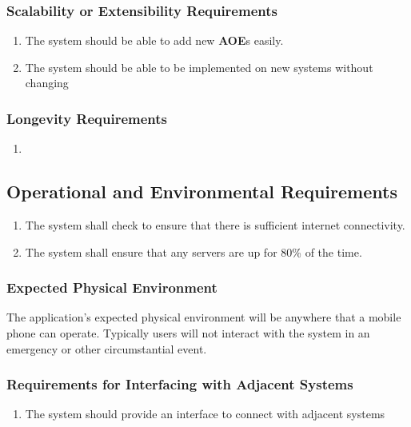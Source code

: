 \documentclass[titlepage]{article}
\begin{document}
\subsubsection{Scalability or Extensibility Requirements}
\label{ssub:scalability_or_extensibility_requirements}
\begin{enumerate}
\item
The system should be able to add new \textbf{AOE}s easily.
\item
The system should be able to be implemented on new systems without changing 
\end{enumerate}

\subsubsection{Longevity Requirements}
\label{ssub:longevity_requirements}
\begin{enumerate}[{PR}1. ]
	\item 
\end{enumerate}


\subsection{Operational and Environmental Requirements}
\label{sub:operational_and_environmental_requirements}
\begin{enumerate}
\item
The system shall check to ensure that there is sufficient internet connectivity.
\item
The system shall ensure that any servers are up for 80\% of the time.
\end{enumerate}

\subsubsection{Expected Physical Environment}
\label{ssub:expected_physical_environment}
The application's expected physical environment will be anywhere that a mobile phone can operate. Typically users will not interact with the system in an emergency or other circumstantial event.

\subsubsection{Requirements for Interfacing with Adjacent Systems}
\label{ssub:requirements_for_interfacing_with_adjacent_systems}
\begin{enumerate}[{OE}1. ]
	\item 
	The system should provide an interface to connect with adjacent systems 
\end{enumerate}
\end{document}
